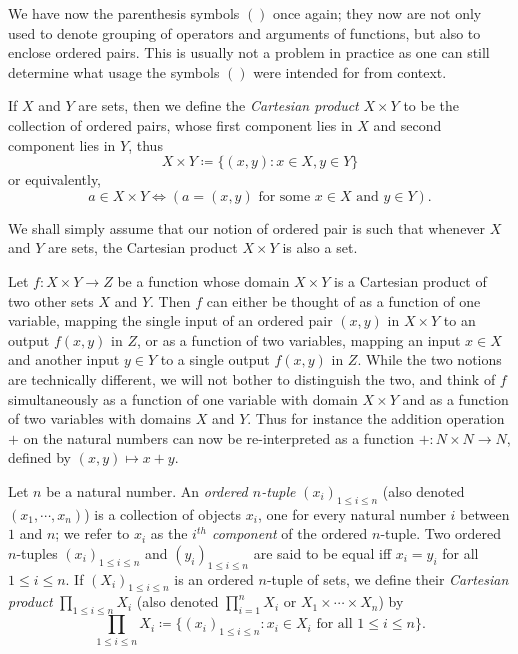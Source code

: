 \begin{remark}\label{3.5.3}
We have now  the parenthesis symbols \(()\) once again;
they now are not only used to denote grouping of operators and arguments of functions, but also to enclose ordered pairs.
This is usually not a problem in practice as one can still determine what usage the symbols \(()\) were intended for from context.
\end{remark}

\begin{definition}\label{3.5.4}
If \(X\) and \(Y\) are sets, then we define the \emph{Cartesian product} \(X \times Y\) to be the collection of ordered pairs, whose first component lies in \(X\) and second component lies in \(Y\), thus
\[
    X \times Y \coloneqq \{(x, y) : x \in X, y \in Y\}
\]
or equivalently,
\[
    a \in X \times Y \iff (a = (x, y) \text{ for some } x \in X \text{ and } y \in Y).
\]
\end{definition}

\begin{remark}\label{3.5.5}
We shall simply assume that our notion of ordered pair is such that whenever \(X\) and \(Y\) are sets, the Cartesian product \(X \times Y\) is also a set.
\end{remark}

Let \(f : X \times Y \to Z\) be a function whose domain \(X \times Y\) is a Cartesian product of two other sets \(X\) and \(Y\).
Then \(f\) can either be thought of as a function of one variable, mapping the single input of an ordered pair \((x, y)\) in \(X \times Y\) to an output \(f(x, y)\) in \(Z\), or as a function of two variables, mapping an input \(x \in X\) and another input \(y \in Y\) to a single output \(f(x, y)\) in \(Z\).
While the two notions are technically different, we will not bother to distinguish the two, and think of \(f\) simultaneously as a function of one variable with domain \(X \times Y\) and as a function of two variables with domains \(X\) and \(Y\).
Thus for instance the addition operation \(+\) on the natural numbers can now be re-interpreted as a function \(+ : N \times N \to N\), defined by \((x, y) \mapsto x + y\).

\setcounter{theorem}{6}
\begin{definition}\label{3.5.7}
Let \(n\) be a natural number.
An \emph{ordered \(n\)-tuple} \((x_i)_{1 \leq i \leq n}\) (also denoted \((x_1, \cdots, x_n)\)) is a collection of objects \(x_i\), one for every natural number \(i\) between \(1\) and \(n\);
we refer to \(x_i\) as the \emph{\(i^{th}\) component} of the ordered \(n\)-tuple.
Two ordered \(n\)-tuples \((x_i)_{1 \leq i \leq n}\) and \((y_i)_{1 \leq i \leq n}\) are said to be equal iff \(x_i = y_i\) for all \(1 \leq i \leq n\).
If \((X_i)_{1 \leq i \leq n}\) is an ordered \(n\)-tuple of sets, we define their \emph{Cartesian product} \(\prod_{1 \leq i \leq n} X_i\) (also denoted \(\prod_{i=1}^n X_i\) or \(X_1 \times \cdots \times X_n\)) by
\[
    \prod_{1 \leq i \leq n} X_i \coloneqq \{(x_i)_{1 \leq i \leq n} : x_i \in X_i \text{ for all } 1 \leq i \leq n\}.
\]
\end{definition}

